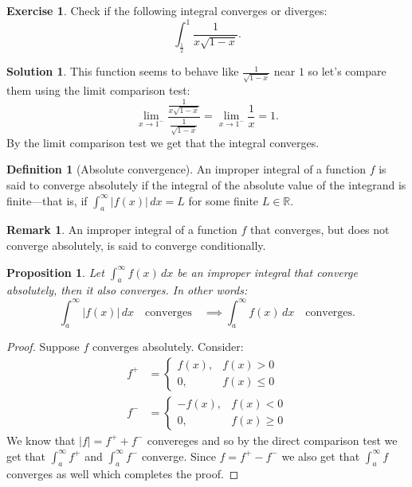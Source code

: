 \documentclass[11pt,a4paper]{article}
\theoremstyle{definition}
\newtheorem{definition}{Definition}[section]
\newtheorem*{solution}{Solution}
\newtheorem{exercise}{Exercise}[section]
\newtheorem{remark}{Remark}[section]
\theoremstyle{plain}
\newtheorem{proposition}[theorem]{Proposition}
\newcommand{\R}{\mathbb{R}}
\newcommand{\abs}[1]{\left\lvert #1\right\rvert}
\begin{document}
  \begin{exercise}
    Check if the following integral converges or diverges:
    \[
      \int_{\frac{1}{2}}^{1} \frac{1}{x \sqrt{1-x}}.
    \]
  \end{exercise}
  \begin{solution}
    This function seems to behave like $\frac{1}{\sqrt{1-x}}$ near $1$
    so let's compare them using the limit comparison test:
    \[
      \lim_{x\to 1^-} \frac{\frac{1}{x\sqrt{1-x}}}{\frac{1}{\sqrt{1-x}}}
      = \lim_{x\to 1^-}{\frac{1}{x}} = 1.
    \]
    By the limit comparison test we get that the integral converges.
  \end{solution}
	
	\newpage
	
  \begin{definition}[Absolute convergence]
    An improper integral of a function $f$ is said to converge absolutely 
    if the integral of the absolute value of the integrand is finite---that is,
    if $\int_a^\infty \abs{f(x)}\,dx = L$ for some finite $L \in \R$.
  \end{definition}
  \begin{remark}
    An improper integral of a function $f$ that converges, but does not
    converge absolutely, is said to converge conditionally.
  \end{remark}

  \begin{proposition}
    Let $\int_a^\infty f(x)\,dx$ be an improper integral that 
    converge absolutely, then it also converges.
    In other words:
    \[
      \int_a^\infty \abs{f(x)}\,dx \quad\mathrm{converges}\quad
      \implies
      \int_a^\infty {f(x)}\,dx \quad\mathrm{converges}.
    \]
  \end{proposition}
  \begin{proof}
    Suppose $f$ converges absolutely. Consider:
    \begin{align*}
      f^+&=
      \begin{cases}
          f(x),  & f(x) > 0 \\
          0,  & f(x) \le 0
      \end{cases} \\
      f^-&=
      \begin{cases}
          -f(x),  & f(x) < 0 \\
          0,  & f(x) \ge 0
      \end{cases}
    \end{align*}
    We know that $\abs{f} = f^+ + f^-$ convereges and so by the direct 
    comparison test we get that  $\int_{a}^{\infty} f^+$ and 
    $\int_{a}^{\infty} f^-$ converge.
    Since $f = f^+ - f^-$ we also get that $\int_{a}^{\infty} f$ converges 
    as well which completes the proof.
  \end{proof}
\end{document}

